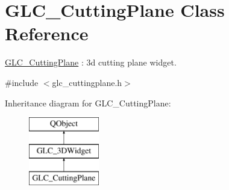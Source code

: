 \hypertarget{class_g_l_c___cutting_plane}{\section{G\-L\-C\-\_\-\-Cutting\-Plane Class Reference}
\label{class_g_l_c___cutting_plane}
}


\hyperlink{class_g_l_c___cutting_plane}{G\-L\-C\-\_\-\-Cutting\-Plane} \-: 3d cutting plane widget.  




{\ttfamily \#include $<$glc\-\_\-cuttingplane.\-h$>$}

Inheritance diagram for G\-L\-C\-\_\-\-Cutting\-Plane\-:\begin{figure}[H]
\begin{center}
\leavevmode
\includegraphics[height=3.000000cm]{class_g_l_c___cutting_plane}
\end{center}
\end{figure}
